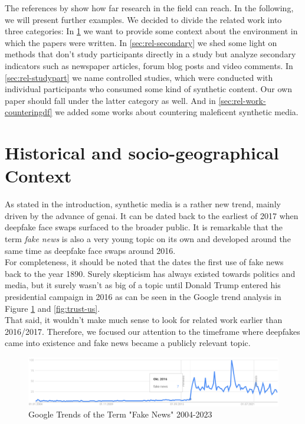 \documentclass[
  a4paper,  %
  twoside,  %
  bibliography=totoc,
  headsepline,
  cleardoublepage=empty,
  parskip=half,
  draft=false
]{scrbook}
\begin{document}
The references by \citet{hancockSocialImpactDeepfakes2021} show how far research in the field can reach. In the following, we will present further examples. We decided to divide the related work into three categories: In \ref{sec:hist-context} we want to provide some context about the environment in which the papers were written. In \ref{sec:rel-secondary} we shed some light on methods that don't study participants directly in a study but analyze secondary indicators such as newspaper articles, forum blog posts and video comments. In \ref{sec:rel-studypart} we name controlled studies, which were conducted with individual participants who consumed some kind of synthetic content. Our own paper should fall under the latter category as well. And in \ref{sec:rel-work-counteringdf} we added some works about countering maleficent synthetic media.

\section{Historical and socio-geographical Context}
\label{sec:hist-context}
As stated in the introduction, synthetic media is a rather new trend, mainly driven by the advance of \gls{genai}. It can be dated back to the earliest of 2017 when deepfake face swaps surfaced to the broader public. It is remarkable that the term \textit{fake news} is also a very young topic on its own and developed around the same time as deepfake face swaps around 2016. \\
For completeness, it should be noted that the \citet{merriam-websterdictionaryRealStoryFake} dates the first use of fake news back to the year 1890. Surely skepticism has always existed towards politics and media, but it surely wasn't as big of a topic until Donald Trump entered his presidential campaign in 2016 as can be seen in the Google trend analysis in Figure \ref{fig:gtrend-fake-news} and \ref{fig:trust-us}. \\
That said, it wouldn't make much sense to look for related work earlier than 2016/2017. Therefore, we focused our attention to the timeframe where deepfakes came into existence and fake news became a publicly relevant topic.

\begin{figure}[h]
  \centering
  \includegraphics[width=1\textwidth]{./graphics/gtrends_fakenews_1011-2311.png}
  \caption{Google Trends of the Term "Fake News" 2004-2023}
  \label{fig:gtrend-fake-news}
\end{figure}
\end{document}
